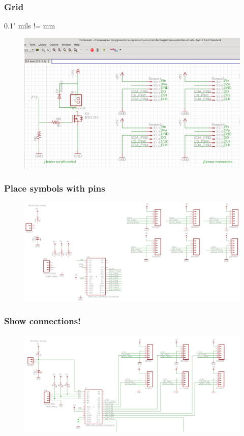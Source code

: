 \documentclass{beamer}
\begin{document}
\begin{frame}
\frametitle{Grid}
0.1"
mils != mm
\begin{figure}
\includegraphics[width=1.0\linewidth]{grid.png}
\end{figure}
\end{frame}


\begin{frame}
\frametitle{Place symbols with pins}
\begin{figure}
\includegraphics[width=1\linewidth]{symbols.png}
\end{figure}
\end{frame}


\begin{frame}
\frametitle{Show connections!}
\begin{figure}
\includegraphics[width=1\linewidth]{symbols-connected.png}
\end{figure}
\end{frame}
\end{document}
